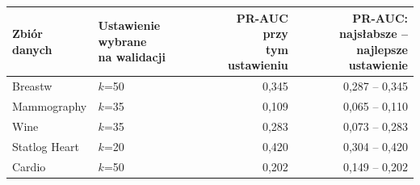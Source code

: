 \begin{tabular}{llrr}
\toprule
Zbiór danych & \makecell[l]{Ustawienie wybrane\\na walidacji} & \makecell[r]{PR-AUC przy\\tym ustawieniu} & \makecell[r]{PR-AUC: najsłabsze --\\najlepsze ustawienie} \\
\midrule
Breastw & $k$=50 & 0,345 & 0,287 -- 0,345 \\
Mammography & $k$=35 & 0,109 & 0,065 -- 0,110 \\
Wine & $k$=35 & 0,283 & 0,073 -- 0,283 \\
Statlog Heart & $k$=20 & 0,420 & 0,304 -- 0,420 \\
Cardio & $k$=50 & 0,202 & 0,149 -- 0,202 \\
\bottomrule
\end{tabular}
